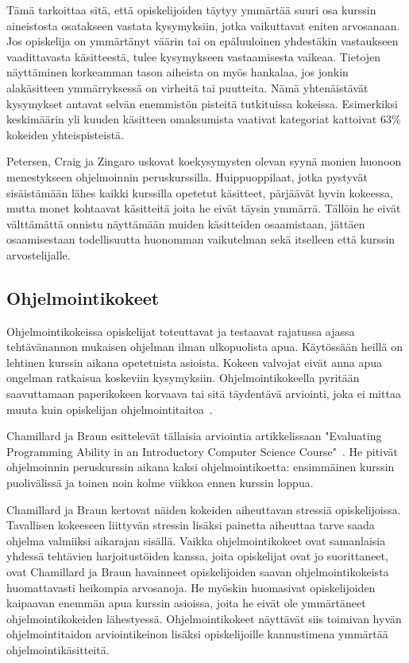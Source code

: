 \documentclass[finnish]{../tktltiki2}
\theoremstyle{definition}
\theoremstyle{remark}
\begin{document}
Tämä tarkoittaa sitä, että opiskelijoiden täytyy ymmärtää suuri osa kurssin aineistosta osatakseen vastata kysymyksiin, jotka vaikuttavat eniten arvosanaan. Jos opiskelija on ymmärtänyt väärin tai on epäluuloinen yhdestäkin vastaukseen vaadittavasta käsitteestä, tulee kysymykseen vastaamisesta vaikeaa. Tietojen näyttäminen korkeamman tason aiheista on myös hankalaa, jos jonkin alakäsitteen ymmärryksessä on virheitä tai puutteita. Nämä yhtenäistävät kysymykset antavat selvän enemmistön pisteitä tutkituissa kokeissa. Esimerkiksi keskimäärin yli kuuden käsitteen omaksumista vaativat kategoriat kattoivat 63\% kokeiden yhteispisteistä.

Petersen, Craig ja Zingaro uskovat koekysymysten olevan syynä monien huonoon menestykseen ohjelmoinnin peruskurssilla. Huippuoppilaat, jotka pystyvät sisäistämään lähes kaikki kurssilla opetetut käsitteet, pärjäävät hyvin kokeessa, mutta monet kohtaavat käsitteitä joita he eivät täysin ymmärrä. Tällöin he eivät välttämättä onnistu näyttämään muiden käsitteiden osaamistaan, jättäen osaamisestaan todellisuutta huonomman vaikutelman sekä itselleen että kurssin arvostelijalle.

\subsection{Ohjelmointikokeet}

Ohjelmointikokeissa opiskelijat toteuttavat ja testaavat rajatussa ajassa tehtävänannon mukaisen ohjelman ilman ulkopuolista apua. Käytössään heillä on lehtinen kurssin aikana opetetuista asioista. Kokeen valvojat eivät anna apua ongelman ratkaisua koskeviin kysymyksiin. Ohjelmointikokeella pyritään saavuttamaan paperikokeen korvaava tai sitä täydentävä arviointi, joka ei mittaa muuta kuin opiskelijan ohjelmointitaitoa~\cite{CB00, DW04}.

Chamillard ja Braun esittelevät tällaisia arviointia artikkelissaan "Evaluating Programming Ability in an Introductory Computer Science Course"~\cite{CB00}. He pitivät ohjelmoinnin peruskurssin aikana kaksi ohjelmointikoetta: ensimmäinen kurssin puolivälissä ja toinen noin kolme viikkoa ennen kurssin loppua.

Chamillard ja Braun kertovat näiden kokeiden aiheuttavan stressiä opiskelijoissa. Tavallisen kokeeseen liittyvän stressin lisäksi painetta aiheuttaa tarve saada ohjelma valmiiksi aikarajan sisällä. Vaikka ohjelmointikokeet ovat samanlaisia yhdessä tehtävien harjoitustöiden kanssa, joita opiskelijat ovat jo suorittaneet, ovat Chamillard ja Braun havainneet opiskelijoiden saavan ohjelmointikokeista huomattavasti heikompia arvosanoja. He myöskin huomasivat opiskelijoiden kaipaavan enemmän apua kurssin asioissa, joita he eivät ole ymmärtäneet ohjelmointikokeiden lähestyessä. Ohjelmointikokeet näyttävät siis toimivan hyvän ohjelmointitaidon arviointikeinon lisäksi opiskelijoille kannustimena ymmärtää ohjelmointikäsitteitä.
\end{document}
